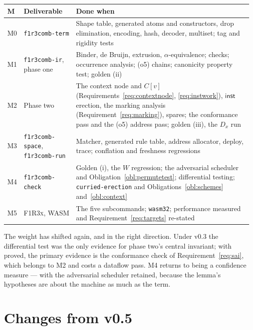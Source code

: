 \documentclass[11pt,a4paper]{article}
\newcommand{\code}[1]{\texttt{#1}}
\newcommand{\Fx}{\textsc{F1R3x}}
\newcommand{\inst}{\mathsf{inst}}
\theoremstyle{definition}
\theoremstyle{plain}
\begin{document}
\begin{center}
\begin{tabularx}{\linewidth}{@{}ll>{\raggedright\arraybackslash}X@{}}
\toprule
M & Deliverable & Done when\\
\midrule
M0 & \code{f1r3comb-term} & Shape table, generated atoms and constructors,
drop elimination, encoding, hash, decoder, multiset; tag and rigidity tests\\
M1 & \code{f1r3comb-ir}, phase one & Binder, de Bruijn, extrusion,
$\alpha$-equivalence; checks; occurrence analysis; (o5) chains; canonicity
property test; golden (ii)\\
M2 & Phase two & The context node and $C[v]$
(Requirements~\ref{req:contextnode}, \ref{req:instwork}), $\inst$ erection,
the marking analysis (Requirement~\ref{req:marking}), spares; the
\cite[Def.~6.10]{draft3} conformance pass and the (o5) address pass; golden
(iii), the $D_{x}$ run\\
M3 & \code{f1r3comb-space}, \code{f1r3comb-run} & Matcher, generated rule
table, address allocator, deploy, trace; conflation and freshness regressions\\
M4 & \code{f1r3comb-check} & Golden (i), the $W$ regression; the adversarial
scheduler and Obligation~\ref{obl:permutetest}; differential testing;
\code{curried-erection} and Obligations~\ref{obl:schemes}
and~\ref{obl:context}\\
M5 & \Fx{}, WASM & The five subcommands; \code{wasm32}; performance measured
and Requirement~\ref{req:targets} re-stated\\
\bottomrule
\end{tabularx}
\end{center}

\noindent
The weight has shifted again, and in the right direction. Under v0.3 the
differential test was the only evidence for phase two's central invariant;
with \cite[Lem.~6.11]{draft3} proved, the primary evidence is the conformance
check of Requirement~\ref{req:sai}, which belongs to M2 and costs a dataflow
pass. M4 returns to being a confidence measure --- with the adversarial
scheduler retained, because the lemma's hypotheses are about the machine as
much as the term.

\section{Changes from v0.5}\label{sec:v5delta}
\end{document}
